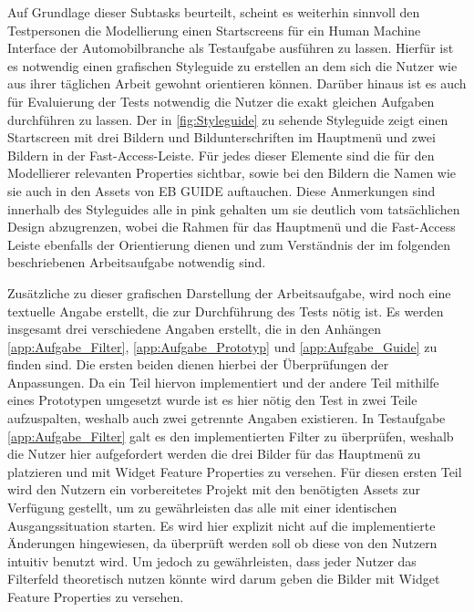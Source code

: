 Auf Grundlage dieser Subtasks beurteilt, scheint es weiterhin sinnvoll den Testpersonen die Modellierung einen Startscreens für ein Human Machine Interface der Automobilbranche als Testaufgabe ausführen zu lassen.
Hierfür ist es notwendig einen grafischen Styleguide zu erstellen an dem sich die Nutzer wie aus ihrer täglichen Arbeit gewohnt orientieren können.
Darüber hinaus ist es auch für Evaluierung der Tests notwendig die Nutzer die exakt gleichen Aufgaben durchführen zu lassen.
Der in \cref{fig:Styleguide} zu sehende Styleguide zeigt einen Startscreen mit drei Bildern und Bildunterschriften im Hauptmenü und zwei Bildern in der Fast-Access-Leiste.
Für jedes dieser Elemente sind die für den Modellierer relevanten Properties sichtbar, sowie bei den Bildern die Namen wie sie auch in den Assets von EB GUIDE auftauchen.
Diese Anmerkungen sind innerhalb des Styleguides alle in pink gehalten um sie deutlich vom tatsächlichen Design abzugrenzen, wobei die Rahmen für das Hauptmenü und die Fast-Access Leiste ebenfalls der Orientierung dienen und zum Verständnis der im folgenden beschriebenen Arbeitsaufgabe notwendig sind.

Zusätzliche zu dieser grafischen Darstellung der Arbeitsaufgabe, wird noch eine textuelle Angabe erstellt, die zur Durchführung des Tests nötig ist.
Es werden insgesamt drei verschiedene Angaben erstellt, die in den Anhängen \ref{app:Aufgabe_Filter}, \ref{app:Aufgabe_Prototyp} und \ref{app:Aufgabe_Guide} zu finden sind.
Die ersten beiden dienen hierbei der Überprüfungen der Anpassungen.
Da ein Teil hiervon implementiert und der andere Teil mithilfe eines Prototypen umgesetzt wurde ist es hier nötig den Test in zwei Teile aufzuspalten, weshalb auch zwei getrennte Angaben existieren.
In Testaufgabe \ref{app:Aufgabe_Filter} galt es den implementierten Filter zu überprüfen, weshalb die Nutzer hier aufgefordert werden die drei Bilder für das Hauptmenü zu platzieren und mit Widget Feature Properties zu versehen.
Für diesen ersten Teil wird den Nutzern ein vorbereitetes Projekt mit den benötigten Assets zur Verfügung gestellt, um zu gewährleisten das alle mit einer identischen Ausgangssituation starten.
Es wird hier explizit nicht auf die implementierte Änderungen hingewiesen, da überprüft werden soll ob diese von den Nutzern intuitiv benutzt wird.
Um jedoch zu gewährleisten, dass jeder Nutzer das Filterfeld theoretisch nutzen könnte wird darum geben die Bilder mit Widget Feature Properties zu versehen.

